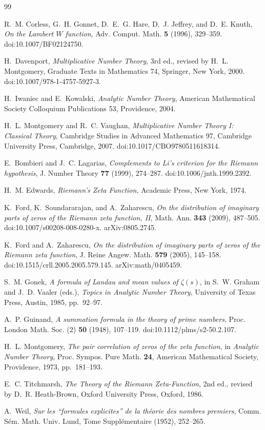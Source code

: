 \documentclass[11pt]{amsart}
\numberwithin{equation}{section}
\theoremstyle{plain}
\theoremstyle{definition}
\theoremstyle{remark}
\newcommand{\1}{\mathbf{1}}
\begin{document}
\begin{thebibliography}{99}

R.~M. Corless, G.~H. Gonnet, D.~E.~G. Hare, D.~J. Jeffrey, and D.~E. Knuth,
\emph{On the Lambert \(W\) function},
Adv. Comput. Math. \textbf{5} (1996), 329--359.
doi:10.1007/BF02124750.



H.~Davenport,
\emph{Multiplicative Number Theory},
3rd ed., revised by H.~L. Montgomery,
Graduate Texts in Mathematics 74, Springer, New York, 2000.
doi:10.1007/978-1-4757-5927-3.

H.~Iwaniec and E.~Kowalski,
\emph{Analytic Number Theory},
American Mathematical Society Colloquium Publications 53,
Providence, 2004.

H.~L. Montgomery and R.~C. Vaughan,
\emph{Multiplicative Number Theory I: Classical Theory},
Cambridge Studies in Advanced Mathematics 97,
Cambridge University Press, Cambridge, 2007.
doi:10.1017/CBO9780511618314.


E.~Bombieri and J.~C. Lagarias,
\emph{Complements to Li's criterion for the Riemann hypothesis},
J. Number Theory \textbf{77} (1999), 274--287.
doi:10.1006/jnth.1999.2392.

H.~M. Edwards,
\emph{Riemann's Zeta Function},
Academic Press, New York, 1974.

K.~Ford, K.~Soundararajan, and A.~Zaharescu,
\emph{On the distribution of imaginary parts of zeros of the Riemann
zeta function, II},
Math. Ann. \textbf{343} (2009), 487--505.
doi:10.1007/s00208-008-0280-x.
arXiv:0805.2745.

K.~Ford and A.~Zaharescu,
\emph{On the distribution of imaginary parts of zeros of the Riemann
zeta function},
J. Reine Angew. Math. \textbf{579} (2005), 145--158.
doi:10.1515/crll.2005.2005.579.145.
arXiv:math/0405459.

S.~M. Gonek,
\emph{A formula of Landau and mean values of \(\zeta(s)\)},
in S.~W. Graham and J.~D. Vaaler (eds.),
\emph{Topics in Analytic Number Theory},
University of Texas Press, Austin, 1985, pp.~92--97.

A.~P. Guinand,
\emph{A summation formula in the theory of prime numbers},
Proc. London Math. Soc. (2) \textbf{50} (1948), 107--119.
doi:10.1112/plms/s2-50.2.107.

H.~L. Montgomery,
\emph{The pair correlation of zeros of the zeta function},
in \emph{Analytic Number Theory},
Proc. Sympos. Pure Math. \textbf{24},
American Mathematical Society, Providence, 1973, pp.~181--193.

E.~C. Titchmarsh,
\emph{The Theory of the Riemann Zeta-Function},
2nd ed., revised by D.~R. Heath-Brown,
Oxford University Press, Oxford, 1986.

A.~Weil,
\emph{Sur les ``formules explicites'' de la théorie des nombres premiers},
Comm. Sém. Math. Univ. Lund, Tome Supplémentaire (1952), 252--265.

\end{thebibliography}
\end{document}
